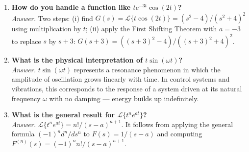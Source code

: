 \documentclass[12pt,a4paper]{article}
\begin{document}
\begin{enumerate}
\item \textbf{How do you handle a function like $te^{-3t}\cos(2t)$?}\\
\textit{Answer.} Two steps: (i) find $G(s)=\mathcal{L}\{t\cos(2t)\}=(s^2-4)/(s^2+4)^2$
using multiplication by $t$; (ii) apply the First Shifting Theorem with $a=-3$
to replace $s$ by $s+3$: $G(s+3)=((s+3)^2-4)/((s+3)^2+4)^2$.

\item \textbf{What is the physical interpretation of $t\sin(\omega t)$?}\\
\textit{Answer.} $t\sin(\omega t)$ represents a resonance phenomenon in which the
amplitude of oscillation grows linearly with time. In control systems and
vibrations, this corresponds to the response of a system driven at its natural
frequency $\omega$ with no damping --- energy builds up indefinitely.

\item \textbf{What is the general result for $\mathcal{L}\{t^n e^{at}\}$?}\\
\textit{Answer.} $\mathcal{L}\{t^n e^{at}\}=n!/(s-a)^{n+1}$. It follows from
applying the general formula $(-1)^n d^n/ds^n$ to $F(s)=1/(s-a)$ and computing
$F^{(n)}(s)=(-1)^n n!/(s-a)^{n+1}$.

\end{enumerate}

\end{document}
